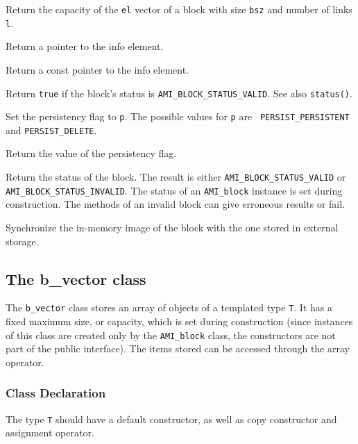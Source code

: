         {Return the capacity of the {\tt el} vector of a block with size 
        {\tt bsz} and number of links {\tt l}.}

         {Return a pointer to the info element.}
        
         {Return a const pointer to the 
        info element.}

         {Return {\tt true} if the block's 
        status is {\tt AMI\_BLOCK\_STATUS\_VALID}. See also {\tt status()}.}

         {Set the persistency flag to
        {\tt p}. The possible values for {\tt p} are {\tt
        PERSIST\_PERSISTENT} and {\tt PERSIST\_DELETE}.}

         {Return the value of the 
        persistency flag.} 

         {Return the status of the
        block. The result is either {\tt AMI\_BLOCK\_STATUS\_VALID} or {\tt
        AMI\_BLOCK\_STATUS\_INVALID}. The status of an {\tt AMI\_block}
        instance is set during construction. The methods of an invalid
        block can give erroneous results or fail.}

         {Synchronize the in-memory image of the
        block with the one stored in external storage.}

   \etabb

\subsection{The  b\_vector class}

The {\tt b\_vector} class stores an array of objects of a templated type
{\tt T}. It has a fixed maximum size, or capacity, which is set during
construction (since instances of this class are created only by the
{\tt AMI\_block} class, the constructors are not part of the public
interface). The items stored can be accessed through the array operator.

\subsubsection{Class Declaration}
   \btabb 
         {The type {\tt T}
        should have a default constructor, as well as copy constructor and
        assignment operator.}
   \etabb

